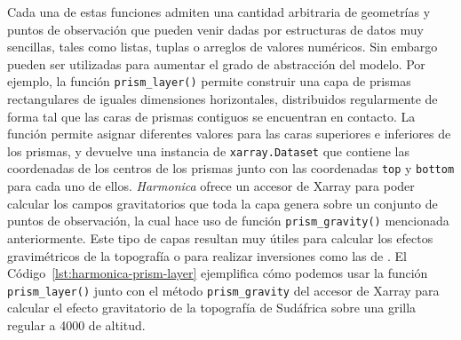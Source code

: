 Cada una de estas funciones admiten una cantidad arbitraria de geometrías
y puntos de observación que pueden venir dadas por estructuras de datos muy
sencillas, tales como listas, tuplas o arreglos de valores numéricos.
Sin embargo pueden ser utilizadas para aumentar el grado de abstracción del
modelo.
Por ejemplo, la función \texttt{prism\_layer()} permite construir una capa de
prismas rectangulares de iguales dimensiones horizontales, distribuidos
regularmente de forma tal que las caras de prismas contiguos se encuentran en
contacto.
La función permite asignar diferentes valores para las caras superiores
e inferiores de los prismas, y devuelve una instancia de
\texttt{xarray.Dataset} que contiene las coordenadas de los centros de los
prismas junto con las coordenadas \texttt{top} y \texttt{bottom} para cada uno
de ellos.
\emph{Harmonica} ofrece un accesor de Xarray para poder calcular los campos
gravitatorios que toda la capa genera sobre un conjunto de puntos de
observación, la cual hace uso de función \texttt{prism\_gravity()} mencionada
anteriormente.
Este tipo de capas resultan muy útiles para calcular los efectos gravimétricos
de la topografía o para realizar inversiones como las de \citet{uieda2017}.
El Código~\ref{lst:harmonica-prism-layer} ejemplifica cómo podemos usar la
función \texttt{prism\_layer()} junto con el método \texttt{prism\_gravity} del
accesor de Xarray para calcular el efecto gravitatorio de la topografía de
Sudáfrica sobre una grilla regular a 4000\m{} de altitud.



